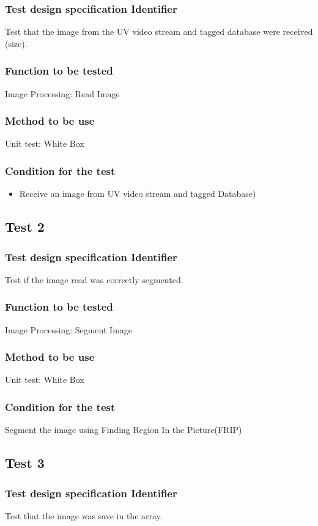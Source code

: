 \documentclass[12pt]{article}
\begin{document}
\subsubsection{Test design specification Identifier}
Test that the image from the UV video stream and tagged database were received (size).
\subsubsection{Function to be tested}
Image Processing: Read Image
\subsubsection{Method to be use}
Unit test: White Box
\subsubsection{Condition for the test}
\begin{itemize}
\item Receive an image from UV video stream and tagged Database)
    \end{itemize}
\subsection{Test 2}

\subsubsection{Test design specification Identifier}
Test if the image read was correctly segmented.
\subsubsection{Function to be tested}
Image Processing: Segment Image
\subsubsection{Method to be use}
Unit test: White Box
\subsubsection{Condition for the test}
Segment the image using Finding Region In the Picture(FRIP)
\subsection{Test 3}

\subsubsection{Test design specification Identifier}
Test that the image was save in the array.
\end{document}
